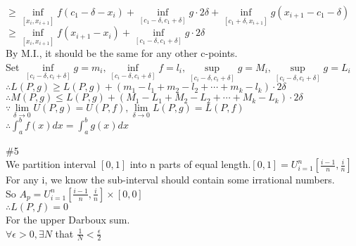 \documentclass{article}
\begin{document}
\qquad$\displaystyle\geq\inf \limits_{[x_i,x_{i+1}]}f(c_1-\delta-x_i)+\inf \limits_{[c_1-\delta,c_1+\delta]}g\cdot2\delta+\inf \limits_{[c_1+\delta,x_{i+1}]}g(x_{i+1}-c_1-\delta)$\\

\qquad$\displaystyle\geq\inf \limits_{[x_i,x_{i+1}]}f(x_{i+1}-x_i)+\inf \limits_{[c_1-\delta,c_1+\delta]}g\cdot2\delta$\\

By M.I., it should be the same for any other c-points.\\

Set $\displaystyle\inf \limits_{[c_i-\delta,c_i+\delta]}g=m_i, \inf \limits_{[c_i-\delta,c_i+\delta]}f=l_i, \sup \limits_{[c_i-\delta,c_i+\delta]}g=M_i, \sup \limits_{[c_i-\delta,c_i+\delta]}g=L_i$\\

$\therefore$\qquad$\displaystyle L(P,g)\geq L(P,g)+(m_1-l_1+m_2-l_2+\cdots+m_k-l_k)\cdot2\delta$\\

$\therefore$\qquad$\displaystyle M(P,g)\leq L(P,g)+(M_1-L_1+M_2-L_2+\cdots+M_k-L_k)\cdot2\delta$\\

$\because$\qquad$\displaystyle\lim \limits_{\delta \to 0}U(P,g)=U(P,f), \displaystyle\lim \limits_{\delta \to 0}L(P,g)=L(P,f) $\\

$\therefore$\qquad$\int_a^bf(x)dx=\int_a^bg(x)dx$\\

\vskip 2cm

\textcolor[rgb]{0.00,0.00,0.50}{\#5}\\

We partition interval $[0,1]$ into n parts of equal length.\qquad $\displaystyle[0,1]=U_{i=1}^n\left[\frac{i-1}{n},\frac{i}{n}\right]$\\

For any i, we know the sub-interval should contain some irrational numbers.\\

So $\displaystyle A_p=U_{i=1}^n\left[\frac{i-1}{n},\frac{i}{n}\right]\times[0,0]$\\

$\therefore$\qquad$L(P,f)=0$\\

For the upper Darboux sum.\\

$\forall\epsilon>0, \exists N$ that $\displaystyle\frac{1}{N}<\frac{\epsilon}{2}$\\
\end{document}
